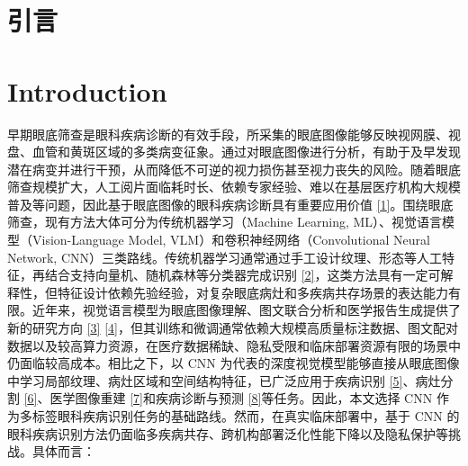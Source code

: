 \section{引言}\label{ux5f15ux8a00}

\section*{Introduction}

早期眼底筛查是眼科疾病诊断的有效手段，所采集的眼底图像能够反映视网膜、视盘、血管和黄斑区域的多类病变征象。通过对眼底图像进行分析，有助于及早发现潜在病变并进行干预，从而降低不可逆的视力损伤甚至视力丧失的风险。随着眼底筛查规模扩大，人工阅片面临耗时长、依赖专家经验、难以在基层医疗机构大规模普及等问题，因此基于眼底图像的眼科疾病诊断具有重要应用价值 \hyperref[_Ref213949315]{{[}1{]}}。围绕眼底筛查，现有方法大体可分为传统机器学习（Machine Learning, ML）、视觉语言模型（Vision-Language Model, VLM）和卷积神经网络（Convolutional Neural Network, CNN）三类路线。传统机器学习通常通过手工设计纹理、形态等人工特征，再结合支持向量机、随机森林等分类器完成识别 \hyperref[_RefRahman2022MLFundus]{{[}2{]}}，这类方法具有一定可解释性，但特征设计依赖先验经验，对复杂眼底病灶和多疾病共存场景的表达能力有限。近年来，视觉语言模型为眼底图像理解、图文联合分析和医学报告生成提供了新的研究方向 \hyperref[_RefLim2024VLVOphthalmology]{{[}3{]}} \hyperref[_RefUrooj2025LLMMedicalImage]{{[}4{]}}，但其训练和微调通常依赖大规模高质量标注数据、图文配对数据以及较高算力资源，在医疗数据稀缺、隐私受限和临床部署资源有限的场景中仍面临较高成本。相比之下，以 CNN 为代表的深度视觉模型能够直接从眼底图像中学习局部纹理、病灶区域和空间结构特征，已广泛应用于疾病识别 \hyperref[_Ref213871637]{{[}5{]}}、病灶分割 \hyperref[_Ref213948625]{{[}6{]}}、医学图像重建 \hyperref[_Ref213948898]{{[}7{]}}和疾病诊断与预测 \hyperref[_Ref213949262]{{[}8{]}}等任务。因此，本文选择 CNN 作为多标签眼科疾病识别任务的基础路线。然而，在真实临床部署中，基于 CNN 的眼科疾病识别方法仍面临多疾病共存、跨机构部署泛化性能下降以及隐私保护等挑战。具体而言：

